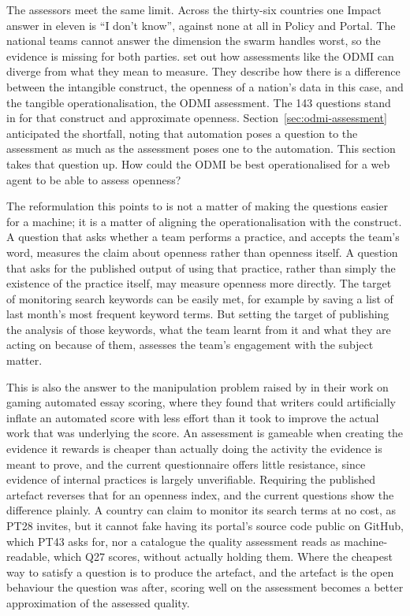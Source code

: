 The assessors meet the same limit. Across the thirty-six countries one Impact answer in eleven is ``I don't know'', against none at all in Policy and Portal. The national teams cannot answer the dimension the swarm handles worst, so the evidence is missing for both parties. \citet{jacobs2021} set out how assessments like the ODMI can diverge from what they mean to measure. They describe how there is a difference between the intangible construct, the openness of a nation's data in this case, and the tangible operationalisation, the ODMI assessment. The 143 questions stand in for that construct and approximate openness. Section~\ref{sec:odmi-assessment} anticipated the shortfall, noting that automation poses a question to the assessment as much as the assessment poses one to the automation. This section takes that question up. How could the ODMI be best operationalised for a web agent to be able to assess openness?

The reformulation this points to is not a matter of making the questions easier for a machine; it is a matter of aligning the operationalisation with the construct. A question that asks whether a team performs a practice, and accepts the team's word, measures the claim about openness rather than openness itself. A question that asks for the published output of using that practice, rather than simply the existence of the practice itself, may measure openness more directly. The target of monitoring search keywords can be easily met, for example by saving a list of last month's most frequent keyword terms. But setting the target of publishing the analysis of those keywords, what the team learnt from it and what they are acting on because of them, assesses the team's engagement with the subject matter.

This is also the answer to the manipulation problem raised by \citet{powers2002} in their work on gaming automated essay scoring, where they found that writers could artificially inflate an automated score with less effort than it took to improve the actual work that was underlying the score. An assessment is gameable when creating the evidence it rewards is cheaper than actually doing the activity the evidence is meant to prove, and the current questionnaire offers little resistance, since evidence of internal practices is largely unverifiable. Requiring the published artefact reverses that for an openness index, and the current questions show the difference plainly. A country can claim to monitor its search terms at no cost, as PT28 invites, but it cannot fake having its portal's source code public on GitHub, which PT43 asks for, nor a catalogue the quality assessment reads as machine-readable, which Q27 scores, without actually holding them. Where the cheapest way to satisfy a question is to produce the artefact, and the artefact is the open behaviour the question was after, scoring well on the assessment becomes a better approximation of the assessed quality.

